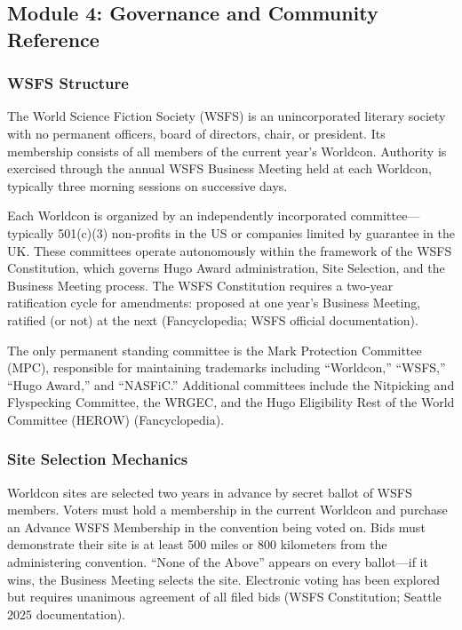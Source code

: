 \documentclass[11pt,letterpaper]{article}
\begin{document}
\subsection{Module 4: Governance and Community Reference}

\subsubsection{WSFS Structure}

The World Science Fiction Society (WSFS) is an unincorporated literary society with no permanent officers, board of directors, chair, or president. Its membership consists of all members of the current year's Worldcon. Authority is exercised through the annual WSFS Business Meeting held at each Worldcon, typically three morning sessions on successive days.

Each Worldcon is organized by an independently incorporated committee---typically 501(c)(3) non-profits in the US or companies limited by guarantee in the UK. These committees operate autonomously within the framework of the WSFS Constitution, which governs Hugo Award administration, Site Selection, and the Business Meeting process. The WSFS Constitution requires a two-year ratification cycle for amendments: proposed at one year's Business Meeting, ratified (or not) at the next (Fancyclopedia; WSFS official documentation).

The only permanent standing committee is the Mark Protection Committee (MPC), responsible for maintaining trademarks including ``Worldcon,'' ``WSFS,'' ``Hugo Award,'' and ``NASFiC.'' Additional committees include the Nitpicking and Flyspecking Committee, the WRGEC, and the Hugo Eligibility Rest of the World Committee (HEROW) (Fancyclopedia).

\subsubsection{Site Selection Mechanics}

Worldcon sites are selected two years in advance by secret ballot of WSFS members. Voters must hold a membership in the current Worldcon and purchase an Advance WSFS Membership in the convention being voted on. Bids must demonstrate their site is at least 500 miles or 800 kilometers from the administering convention. ``None of the Above'' appears on every ballot---if it wins, the Business Meeting selects the site. Electronic voting has been explored but requires unanimous agreement of all filed bids (WSFS Constitution; Seattle 2025 documentation).
\end{document}
